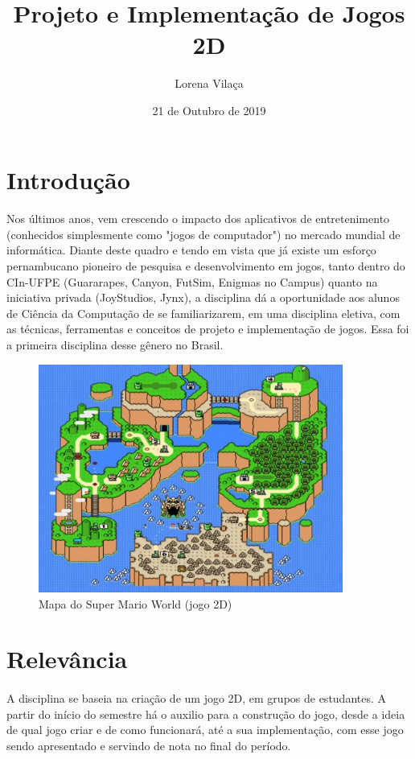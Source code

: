 \documentclass[10pt]{article}
\title{Projeto e Implementação de Jogos 2D}
\author{Lorena Vilaça}
\date{21 de Outubro de 2019}
\begin{document}
\maketitle

\section{Introdução}    
\paragraph{} Nos últimos anos, vem crescendo o impacto dos aplicativos de entretenimento (conhecidos simplesmente como "jogos de computador") no mercado mundial de informática. Diante deste quadro e tendo em vista que já existe um esforço pernambucano pioneiro de pesquisa e desenvolvimento em jogos, tanto dentro do CIn-UFPE (Guararapes, Canyon, FutSim, Enigmas no Campus) quanto na iniciativa privada (JoyStudios, Jynx), a disciplina dá a oportunidade aos alunos de Ciência da Computação de se familiarizarem, em uma disciplina eletiva, com as técnicas, ferramentas e conceitos de projeto e implementação de jogos. Essa foi a primeira disciplina desse gênero no Brasil.

\begin{figure}[h!]
\centering
\includegraphics[width = 10cm]{marioworld.jpg} 
\caption {Mapa do Super Mario World (jogo 2D)}
\end{figure}


\section {Relevância} 
\paragraph{} A disciplina se baseia na criação de um jogo 2D, em grupos de estudantes. A partir do início do semestre há o auxilio para a construção do jogo, desde a ideia de qual jogo criar e de como funcionará, até a sua implementação, com esse jogo sendo apresentado e servindo de nota no final do período.
\end{document}

